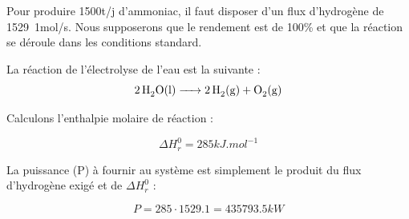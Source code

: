 \documentclass[10pt,a4paper]{article}
\begin{document}
Pour produire \unit{1500}{t/j} d'ammoniac, il faut disposer d'un flux d'hydrogène de \unit{1529.1}{mol/s}. Nous supposerons que le rendement est de \unit{100}{\%} et que la réaction se déroule dans les conditions standard. 

La réaction de l’électrolyse de l'eau est la suivante : 
$$\ce {2H2O(l) -> 2H2(g) + O2(g)}$$ 

Calculons l'enthalpie molaire de réaction :

$$ \Delta H_r^0 =  \unit{285}{kJ.mol^{-1}} $$

La puissance (P) à fournir au système est simplement le produit du flux d'hydrogène exigé et de $ \Delta H_r^0$ :

$$ P = 285\cdot1529.1 = \unit{435 793.5}{kW} $$
\end{document}
